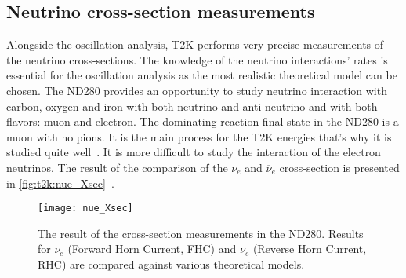 \documentclass[../main.tex]{subfiles}
\begin{document}
\subsection{Neutrino cross-section measurements}
Alongside the oscillation analysis, T2K performs very precise measurements of the neutrino cross-sections. The knowledge of the neutrino interactions' rates is essential for the oscillation analysis as the most realistic theoretical model can be chosen. The ND280 provides an opportunity to study neutrino interaction with carbon, oxygen and iron with both neutrino and anti-neutrino and with both flavors: muon and electron. The dominating reaction final state in the ND280 is a muon with no pions. It is the main process for the T2K energies that's why it is studied quite well~\cite{Abe2020a}. It is more difficult to study the interaction of the electron neutrinos. The result of the comparison of the $\nu_e$ and $\overline{\nu}_e$ cross-section is presented in \autoref{fig:t2k:nue_Xsec}~\cite{Abe2020}.

\begin{figure}[!ht]
  \centering
  \texttt{[image: nue\_Xsec]}
  \caption{The result of the cross-section measurements in the ND280. Results for $\nu_e$ (Forward Horn Current, FHC) and $\overline{\nu}_e$ (Reverse Horn Current, RHC) are compared against various theoretical models.}
  \label{fig:t2k:nue_Xsec}
\end{figure}
\end{document}
